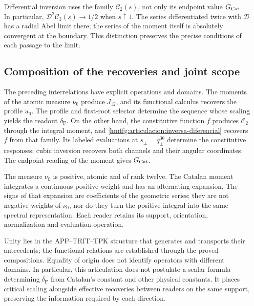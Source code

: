 Differential inversion uses the family \(\mathcal C_2(s)\),
not only its endpoint value \(G_{\rm Cat}\). In particular,
\(\mathcal D^2\mathcal C_2(s)\to1/2\) when \(s\uparrow1\).
The series differentiated twice with \(\mathcal D\) has
a radial Abel limit there; the series of the moment itself is
absolutely convergent at the boundary. This distinction preserves
the precise conditions of each passage to the limit.

\subsection{Composition of the recoveries and joint scope}
\label{hmtfg:articulacion:conclusion}

The preceding interrelations have explicit operations and
domains. The moments of the atomic measure \(\nu_0\)
produce \(J_{12}\), and its functional calculus recovers the profile
\(u_0\). The profile and first-root selector determine
the sequence whose scaling yields the readout \(\delta_{\mathrm F}\).
On the other hand, the constitutive function \(f\) produces
\(\mathcal C_2\) through the integral moment, and
\eqref{hmtfg:articulacion:inversa-diferencial} recovers \(f\)
from that family. Its labeled evaluations at
\(s_\pm=q_\pm^{30}\) determine the constitutive responses;
cubic inversion recovers both channels and their angular
coordinates. The endpoint reading of the moment gives \(G_{\rm Cat}\).

The measure \(\nu_0\) is positive, atomic and of rank twelve.
The Catalan moment integrates a continuous positive weight and has
an alternating expansion. The signs of that expansion are
coefficients of the geometric series; they are not negative weights of
\(\nu_0\), nor do they turn the positive integral into the same
spectral representation. Each reader retains its support,
orientation, normalization and evaluation operation.

Unity lies in the APP--TRIT--TPK structure that generates and
transports their antecedents; the functional relations are
established through the proved compositions. Equality of
origin does not identify operators with different domains.
In particular, this articulation does not postulate a scalar formula
determining \(\delta_{\mathrm F}\) from Catalan’s constant and
other physical constants. It places critical scaling alongside
effective recoveries between readers on the same support,
preserving the information required by each direction.
